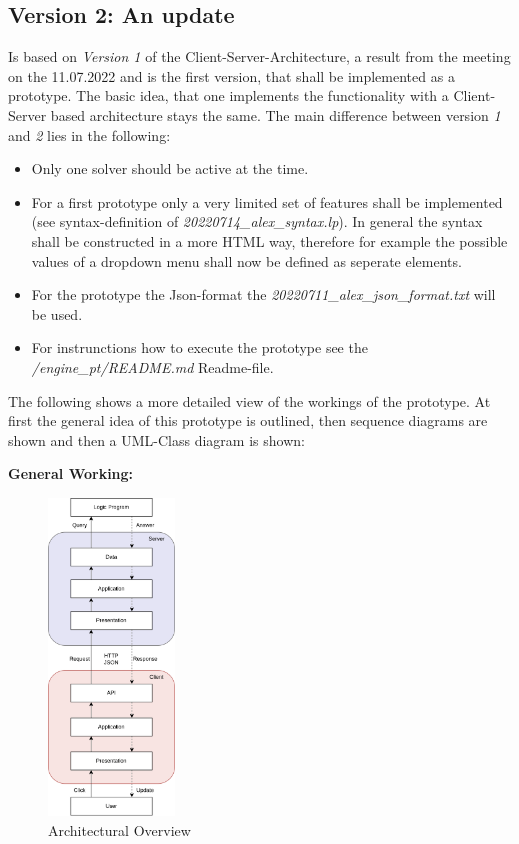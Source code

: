 \documentclass[12pt,a4paper]{article}
\newcommand{\<}[1]{\guilsinglleft}
\renewcommand{\>}[1]{\guilsinglright}
\begin{document}
\newpage
\subsection{Version 2: An update}
\noindent Is based on \textit{Version 1} of the Client-Server-Architecture, a result from the meeting on the 11.07.2022 and is the first version, that shall be implemented as a prototype. The basic idea, that one implements the functionality with a Client-Server based architecture stays the same. The main difference between version \textit{1} and \textit{2} lies in the following:

\begin{itemize}
    \item Only one solver should be active at the time.
    \item For a first prototype only a very limited set of features shall be implemented (see syntax-definition of \textit{20220714\_alex\_syntax.lp}). In general the syntax shall be constructed in a more HTML way, therefore for example the possible values of a dropdown menu shall now be defined as seperate elements.
    \item For the prototype the Json-format the \textit{20220711\_alex\_json\_format.txt} will be used.
    \item For instrunctions how to execute the prototype see the \textit{/engine\_pt/README.md} Readme-file.
\end{itemize}

\noindent The following shows a more detailed view of the workings of the prototype. At first the general idea of this prototype is outlined, then sequence diagrams are shown and then a UML-Class diagram is shown:

\noindent \textbf{General Working:} 

\begin{figure}[ht]
    \begin{center}
    \includegraphics[width=0.3\textwidth]{imgs/pt-v2-server-client.png}
    \caption{Architectural Overview}
    \label{fig:pt-v2-server-client}
    \end{center}
\end{figure}
\end{document}
